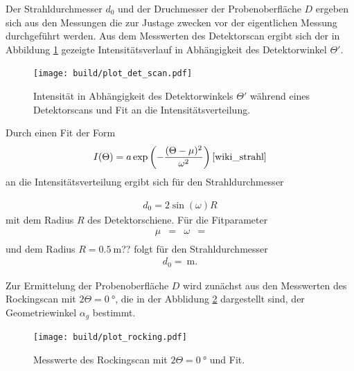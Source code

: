 Der Strahldurchmesser $d_0$ und der Druchmesser der Probenoberfläche $D$
ergeben sich aus den Messungen die zur Justage zwecken vor der eigentlichen Messung durchgeführt werden.
Aus dem Messwerten des Detektorscan ergibt sich der in Abbildung \ref{fig:det_scan}
gezeigte Intensitätsverlauf in Abhängigkeit des Detektorwinkel $\Theta'$.
\begin{figure}
  \centering
  \texttt{[image: build/plot\_det\_scan.pdf]}
  \caption{Intensität in Abhängigkeit des Detektorwinkels $\Theta'$ während eines Detektorscans und Fit an die Intensitätsverteilung.}
  \label{fig:det_scan}
\end{figure}

Durch einen Fit der Form
\begin{align}
I(\Theta) =  a \exp\left(-\frac{(\Theta-\mu)^2}{\omega^2}\right) \text{\cite{wiki_strahl}}
\end{align}
an die Intensitätsverteilung ergibt sich für den Strahldurchmesser

\begin{align}
d_0 = 2 \sin(\omega) R \label{eqn:d_o}
\end{align}
mit dem Radius $R$ des Detektorschiene.
Für die Fitparameter
\begin{align}
\mu&= & \omega&= \\
\end{align}
und dem Radius $R=\SI{0.5}{\meter}$?? folgt für den Strahldurchmesser
\begin{align}
  d_0=\SI{}{\meter}.
\end{align}

Zur Ermittelung der Probenoberfläche $D$ wird zunächst aus den Messwerten
des Rockingscan mit $2\Theta = \SI{0}{\degree}$, die in der Abblidung \ref{fig:rock_scan_0}
dargestellt sind,
der Geometriewinkel  $\alpha_g$ bestimmt.


\begin{figure}
  \centering
  \texttt{[image: build/plot\_rocking.pdf]}
  \caption{Messwerte des Rockingscan mit $2\Theta = \SI{0}{\degree}$ und Fit.}
  \label{fig:rock_scan_0}
\end{figure}

